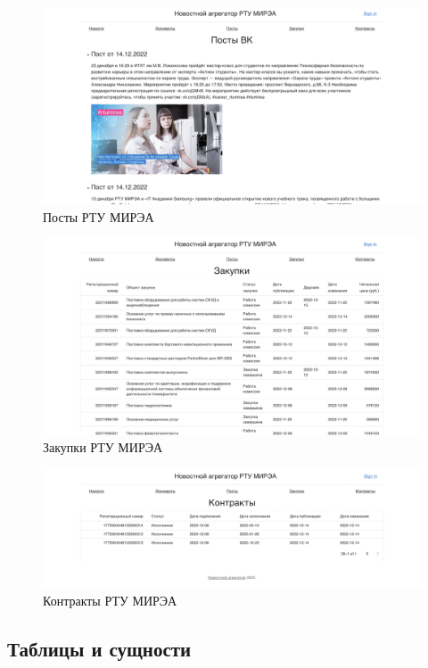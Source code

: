 \documentclass{mirea}
\begin{document}
	\begin{figure}[H]
		\centering
		\includegraphics[width=\textwidth]{screen_posts}
		\parskip=6pt
		\caption{Посты РТУ МИРЭА}
	\end{figure}

	\begin{figure}[H]
		\centering
		\includegraphics[width=\textwidth]{screen_purchases}
		\parskip=6pt
		\caption{Закупки РТУ МИРЭА}
	\end{figure}

	\begin{figure}[H]
		\centering
		\includegraphics[width=\textwidth]{screen_contracts}
		\parskip=6pt
		\caption{Контракты РТУ МИРЭА}
	\end{figure}
	
	\subsection{Таблицы и сущности}
	
\end{document}
